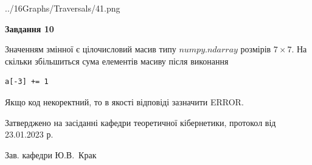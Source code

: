 \documentclass[12pt, ukrainian]{article}
\begin{document}
{\begin {large}
\begin{center}
	{../16Graphs/Traversals/41.png}
\end{center}\par
\newpage

{\begin {center}\textbf{Завдання 10}\end {center}}\par
Значенням змінної  є цілочисловий масив типу $numpy.ndarray$ розмірів $7{\times}7$. На скільки збільшиться сума елементів масиву  після виконання
\begin{verbatim}
a[-3] += 1
\end{verbatim}


Якщо код некоректний, то в якості відповіді зазначити ERROR.\par
\newpage


\end {large}
}
{\smallskip \begin {small} Затверджено на засіданні кафедри теоретичної кібернетики, протокол  від   23.01.2023 р.\par\smallskip\smallskip
{\parbox {6.5 cm}{Зав. кафедри \dotfill Ю.В.~Крак}} \end{small}}
\end{document}
